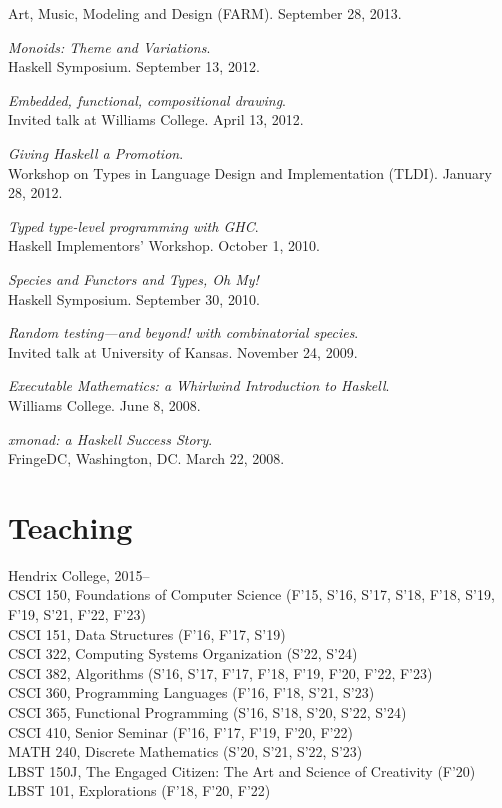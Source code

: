 \documentclass[12pt]{article}
\newcommand{\cvitem}{\par\hangpara{2em}{1}}
\begin{document}
    Art, Music, Modeling and Design (FARM).  September 28, 2013.
\cvitem \emph{Monoids: Theme and Variations}. \\ Haskell Symposium.
    September 13, 2012.
\cvitem \emph{Embedded, functional, compositional drawing}. \\ Invited
    talk at Williams College. April 13, 2012.
\cvitem \emph{Giving Haskell a Promotion}. \\ Workshop on Types in
    Language Design and Implementation (TLDI). January 28, 2012.
\cvitem \emph{Typed type-level programming with GHC}. \\ Haskell
    Implementors' Workshop. October 1, 2010.
\cvitem \emph{Species and Functors and Types, Oh My!} \\ Haskell
    Symposium. September 30, 2010.
\cvitem \emph{Random testing---and beyond! with combinatorial
    species}. \\ Invited talk at University of Kansas.  November 24, 2009.
\cvitem \emph{Executable Mathematics: a Whirlwind Introduction to
    Haskell}. \\ Williams College.  June 8, 2008.
\cvitem \emph{xmonad: a Haskell Success Story}. \\ FringeDC, Washington,
    DC. March 22, 2008.

\section*{Teaching}

\cvitem
Hendrix College, 2015-- \\
CSCI 150, Foundations of Computer Science (F'15, S'16, S'17, S'18,
F'18, S'19, F'19, S'21, F'22, F'23) \\
CSCI 151, Data Structures (F'16, F'17, S'19) \\
CSCI 322, Computing Systems Organization (S'22, S'24) \\
CSCI 382, Algorithms (S'16, S'17, F'17, F'18, F'19, F'20, F'22, F'23) \\
CSCI 360, Programming Languages (F'16, F'18, S'21, S'23) \\
CSCI 365, Functional Programming (S'16, S'18, S'20, S'22, S'24) \\
CSCI 410, Senior Seminar (F'16, F'17, F'19, F'20, F'22) \\
MATH 240, Discrete Mathematics (S'20, S'21, S'22, S'23) \\
LBST 150J, The Engaged Citizen: The Art and Science of Creativity
(F'20) \\
LBST 101, Explorations (F'18, F'20, F'22)
\end{document}

